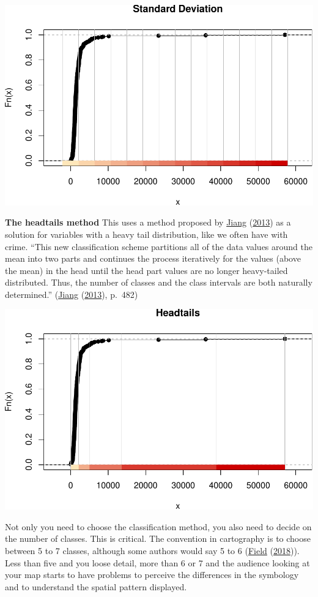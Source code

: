 \documentclass[
]{book}
\begin{document}
\includegraphics{crime_mapping_files/figure-latex/unnamed-chunk-93-1.pdf}

\textbf{The headtails method} This uses a method proposed by \protect\hyperlink{ref-Jiang_2013}{Jiang} (\protect\hyperlink{ref-Jiang_2013}{2013}) as a solution for variables with a heavy tail distribution, like we often have with crime. ``This new classification scheme partitions all of the data values around the mean into two parts and continues the process iteratively for the values (above the mean) in the head until the head part values are no longer heavy-tailed distributed. Thus, the number of classes and the class intervals are both naturally determined.'' (\protect\hyperlink{ref-Jiang_2013}{Jiang} (\protect\hyperlink{ref-Jiang_2013}{2013}), p.~482)

\includegraphics{crime_mapping_files/figure-latex/unnamed-chunk-94-1.pdf}

Not only you need to choose the classification method, you also need to decide on the number of classes. This is critical. The convention in cartography is to choose between 5 to 7 classes, although some authors would say 5 to 6 (\protect\hyperlink{ref-Field_2018}{Field} (\protect\hyperlink{ref-Field_2018}{2018})). Less than five and you loose detail, more than 6 or 7 and the audience looking at your map starts to have problems to perceive the differences in the symbology and to understand the spatial pattern displayed.
\end{document}
